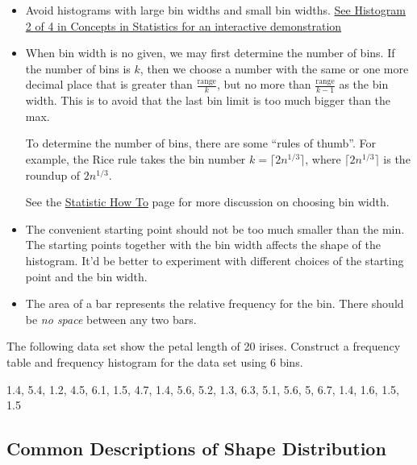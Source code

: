 \begin{remark}
\mbox{}
\begin{itemize}
\item
  Avoid histograms with large bin widths and small bin widths.
  \href{https://courses.lumenlearning.com/wmopen-concepts-statistics/chapter/histograms-2-of-4/}{See
  Histogram 2 of 4 in Concepts in Statistics for an interactive
  demonstration}
\item
  When bin width is no given, we may first determine the number of bins.
  If the number of bins is \(k\), then we choose a number with the same
  or one more decimal place that is greater than
  \(\frac{\text{range}}{k}\), but no more than
  \(\frac{\text{range}}{k-1}\) as the bin width. This is to avoid that
  the last bin limit is too much bigger than the max.

  To determine the number of bins, there are some ``rules of thumb''.
  For example, the Rice rule takes the bin number
  \(k = \lceil 2n^{1/3}\rceil\), where \(\lceil 2n^{1/3}\rceil\) is the
  roundup of \(2n^{1/3}\).

  See the
  \href{https://www.statisticshowto.datasciencecentral.com/choose-bin-sizes-statistics/}{Statistic
  How To} page for more discussion on choosing bin width.
\item
  The convenient starting point should not be too much smaller than the
  min. The starting points together with the bin width affects the shape
  of the histogram. It'd be better to experiment with different choices
  of the starting point and the bin width.
\item
  The area of a bar represents the relative frequency for the bin. There
  should be \emph{no space} between any two bars.
\end{itemize}

\end{remark}

\begin{exercise}
The following data set show the petal length of 20 irises. Construct a
frequency table and frequency histogram for the data set using 6 bins.

1.4, 5.4, 1.2, 4.5, 6.1, 1.5, 4.7, 1.4, 5.6, 5.2, 1.3, 6.3, 5.1, 5.6, 5,
6.7, 1.4, 1.6, 1.5, 1.5
\end{exercise}
\vspace*{8\baselineskip}

\hypertarget{common-descriptions-of-shape-distribution}{%
\subsection{Common Descriptions of Shape
Distribution}\label{common-descriptions-of-shape-distribution}}

